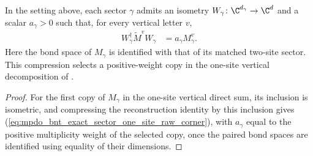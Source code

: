 \begin{lemma}
    \label{thm:mpdo_bnt_exact_sector_one_site_raw_corner}
    \leanok
    In the setting above, each sector $\gamma$ admits an isometry
    $W_\gamma\colon\C^{d_\gamma}\to\C^d$ and a scalar
    $a_\gamma>0$ such that, for every vertical letter $v$,
    \begin{align}
        W_\gamma^\dagger\widetilde M^vW_\gamma
         & =a_\gamma M_\gamma^v.
        \label{eq:mpdo_bnt_exact_sector_one_site_raw_corner}
    \end{align}
    Here the bond space of $M_\gamma$ is
    identified with that of its matched two-site sector. This compression
    selects a positive-weight copy in the one-site vertical decomposition of
    \cite[Proposition~4.13, statement lines~943--951, and Appendix~C.4,
        lines~2046--2057]{Cirac2016MPDO_arXiv}.
\end{lemma}

\begin{proof}\leanok
    For the first copy of $M_\gamma$ in the one-site vertical direct sum,
    its inclusion is isometric, and compressing the reconstruction identity by
    this inclusion gives
    (\ref{eq:mpdo_bnt_exact_sector_one_site_raw_corner}), with
    $a_\gamma$ equal to the positive multiplicity weight of the selected
    copy, once the paired bond spaces are identified using equality of their
    dimensions.
\end{proof}

